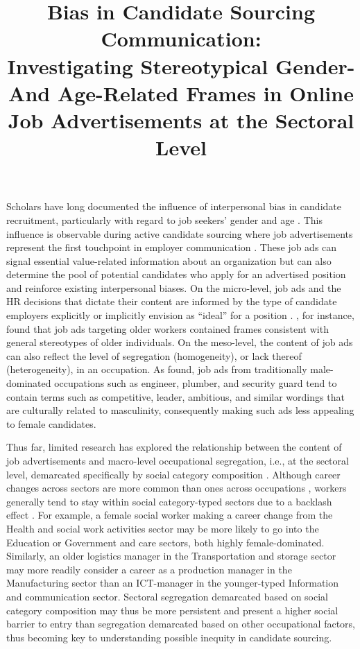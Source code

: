 \documentclass[man]{apa7}
\title{Bias in Candidate Sourcing Communication:\\
Investigating Stereotypical Gender- And Age-Related Frames in Online Job Advertisements at the Sectoral Level}
\begin{document}
\maketitle
Scholars have long documented the influence of interpersonal bias in candidate recruitment, particularly with regard to job seekers’ gender and age \parencite{beattie_possible_2012, heilman_gender_2012, paleari_when_2019}. This influence is observable during active candidate sourcing where job advertisements represent the first touchpoint in employer communication \parencite{RynesS.1989}. These job ads can signal essential value-related information about an organization \parencite{de_cooman_portraying_2012} but can also determine the pool of potential candidates who apply for an advertised position and reinforce existing interpersonal biases. On the micro-level, job ads and the HR decisions that dictate their content are informed by the type of candidate employers explicitly or implicitly envision as “ideal” for a position \parencite{kelly_gendered_2010}. \Textcite{van_selm_search_2021}, for instance, found that job ads targeting older workers contained frames consistent with general stereotypes of older individuals. On the meso-level, the content of job ads can also reflect the level of segregation (homogeneity), or lack thereof (heterogeneity), in an occupation. As \Textcite{gaucher_evidence_2011} found, job ads from traditionally male-dominated occupations such as engineer, plumber, and security guard tend to contain terms such as competitive, leader, ambitious, and similar wordings that are culturally related to masculinity, consequently making such ads less appealing to female candidates.

Thus far, limited research has explored the relationship between the content of job advertisements and macro-level occupational segregation, i.e., at the sectoral level, demarcated specifically by social category composition . Although career changes across sectors are more common than ones across occupations \parencite{carrillo-tudela_extent_2016}, workers generally tend to stay within social category-typed sectors due to a backlash effect \parencite{fritsch_horizontal_2020}. For example, a female social worker making a career change from the Health and social work activities sector may be more likely to go into the Education or Government and care sectors, both highly female-dominated. Similarly, an older logistics manager in the Transportation and storage sector may more readily consider a career as a production manager in the Manufacturing sector than an ICT-manager in the younger-typed Information and communication sector. Sectoral segregation demarcated based on social category composition may thus be more persistent and present a higher social barrier to entry than segregation demarcated based on other occupational factors, thus becoming key to understanding possible inequity in candidate sourcing.
\end{document}
